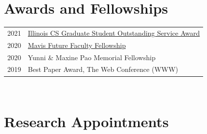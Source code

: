 \documentclass[10pt,singlecolumn]{article} %
\begin{document}
\section{Awards and Fellowships} 

\begin{tabular}{rl}

2021 & \href{https://cs.illinois.edu/about/awards/graduate-fellowships-awards/graduate-student-outstanding-service-award}{Illinois CS Graduate Student Outstanding Service Award} \\ 

2020 & \href{https://mavis.grainger.illinois.edu/}{Mavis Future Faculty Fellowship} \\

2020 & Yunni \& Maxine Pao Memorial Fellowship \\

2019 & Best Paper Award, The Web Conference (WWW) \\
\end{tabular}\\


\section{Research Appointments}
\end{document}
